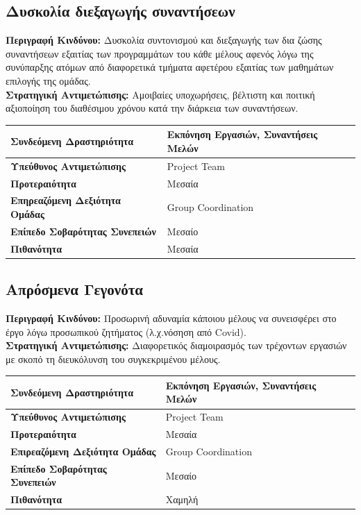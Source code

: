 \documentclass{article}
\newcommand\T{\rule{0pt}{2.6ex}}       %
\newcommand\B{\rule[-1.2ex]{0pt}{0pt}}
\begin{document}
 \subsection{Δυσκολία διεξαγωγής συναντήσεων}
 
 \textbf{Περιγραφή Κινδύνου:} Δυσκολία συντονισμού και διεξαγωγής των δια ζώσης συναντήσεων εξαιτίας των προγραμμάτων του κάθε μέλους αφενός λόγω της συνύπαρξης ατόμων από διαφορετικά τμήματα αφετέρου εξαιτίας των μαθημάτων επιλογής της ομάδας.\\
 
 \textbf{Στρατηγική Αντιμετώπισης:} Αμοιβαίες υποχωρήσεις, βέλτιστη και ποιτική αξιοποίηση του διαθέσιμου χρόνου κατά την διάρκεια των συναντήσεων.
 \begin{center}
     \begin{tabular}{|l|l|}
     \hline
      \textbf{Συνδεόμενη Δραστηριότητα}   & Εκπόνηση Εργασιών, Συναντήσεις Μελών \T\B \\ 
      \hline
      \textbf{Υπεύθυνος Αντιμετώπισης} & Project Team \T\B \\
      \hline
      \textbf{Προτεραιότητα} & Μεσαία \T\B \\
      \hline
      \textbf{Επηρεαζόμενη Δεξιότητα Ομάδας} & Group Coordination \T\B \\
      \hline
      \textbf{Επίπεδο Σοβαρότητας Συνεπειών} & Μεσαίο \T\B \\
      \hline
      \textbf{Πιθανότητα} & Μεσαία \T\B \\
      \hline
     \end{tabular}
 \end{center}
 
 
 \subsection{Απρόσμενα Γεγονότα}
 
\textbf{Περιγραφή Κινδύνου:} Προσωρινή αδυναμία κάποιου μέλους να συνεισφέρει στο έργο λόγω προσωπικού ζητήματος (λ.χ.νόσηση από Covid). \\

\textbf{Στρατηγική Αντιμετώπισης:} Διαφορετικός διαμοιρασμός των τρέχοντων εργασιών με σκοπό τη διευκόλυνση του συγκεκριμένου μέλους.
 
  \begin{center}
     \begin{tabular}{|l|l|}
     \hline
      \textbf{Συνδεόμενη Δραστηριότητα} & Εκπόνηση Εργασιών, Συναντήσεις Μελών \T\B \\ 
      \hline
      \textbf{Υπεύθυνος Αντιμετώπισης} & Project Team \T\B \\
      \hline
      \textbf{Προτεραιότητα} & Μεσαία \T\B \\
      \hline
      \textbf{Επιρεαζόμενη Δεξιότητα Ομάδας} & Group Coordination \T\B \\
      \hline
      \textbf{Επίπεδο Σοβαρότητας Συνεπειών} & Μεσαίο \T\B \\
      \hline
      \textbf{Πιθανότητα} & Χαμηλή \T\B \\
      \hline
     \end{tabular}
 \end{center}
 
\end{document}
